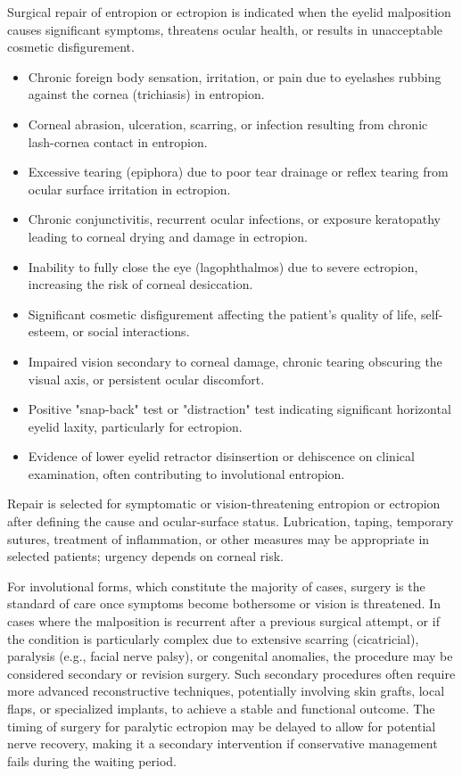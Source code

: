 Surgical repair of entropion or ectropion is indicated when the eyelid malposition causes significant symptoms, threatens ocular health, or results in unacceptable cosmetic disfigurement.

\begin{itemize}
  \item Chronic foreign body sensation, irritation, or pain due to eyelashes rubbing against the cornea (trichiasis) in entropion.
  \item Corneal abrasion, ulceration, scarring, or infection resulting from chronic lash-cornea contact in entropion.
  \item Excessive tearing (epiphora) due to poor tear drainage or reflex tearing from ocular surface irritation in ectropion.
  \item Chronic conjunctivitis, recurrent ocular infections, or exposure keratopathy leading to corneal drying and damage in ectropion.
  \item Inability to fully close the eye (lagophthalmos) due to severe ectropion, increasing the risk of corneal desiccation.
  \item Significant cosmetic disfigurement affecting the patient's quality of life, self-esteem, or social interactions.
  \item Impaired vision secondary to corneal damage, chronic tearing obscuring the visual axis, or persistent ocular discomfort.
  \item Positive "snap-back" test or "distraction" test indicating significant horizontal eyelid laxity, particularly for ectropion.
  \item Evidence of lower eyelid retractor disinsertion or dehiscence on clinical examination, often contributing to involutional entropion.
\end{itemize}

Repair is selected for symptomatic or vision-threatening entropion or ectropion after defining the cause and ocular-surface status. Lubrication, taping, temporary sutures, treatment of inflammation, or other measures may be appropriate in selected patients; urgency depends on corneal risk.

For involutional forms, which constitute the majority of cases, surgery is the standard of care once symptoms become bothersome or vision is threatened. In cases where the malposition is recurrent after a previous surgical attempt, or if the condition is particularly complex due to extensive scarring (cicatricial), paralysis (e.g., facial nerve palsy), or congenital anomalies, the procedure may be considered secondary or revision surgery. Such secondary procedures often require more advanced reconstructive techniques, potentially involving skin grafts, local flaps, or specialized implants, to achieve a stable and functional outcome. The timing of surgery for paralytic ectropion may be delayed to allow for potential nerve recovery, making it a secondary intervention if conservative management fails during the waiting period.

